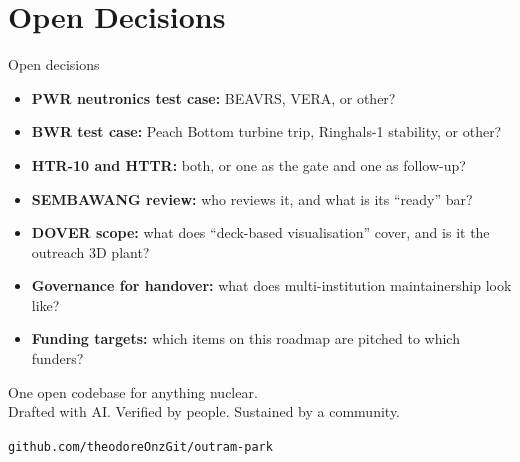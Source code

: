 \documentclass[aspectratio=169]{beamer}
\begin{document}
\section{Open Decisions}

\begin{frame}{Open decisions}
    \begin{itemize}
        \item \textbf{PWR neutronics test case:} BEAVRS, VERA, or other?
        \item \textbf{BWR test case:} Peach Bottom turbine trip, Ringhals-1
              stability, or other?
        \item \textbf{HTR-10 and HTTR:} both, or one as the gate and one
              as follow-up?
        \item \textbf{SEMBAWANG review:} who reviews it, and what is its
              ``ready'' bar?
        \item \textbf{DOVER scope:} what does ``deck-based visualisation''
              cover, and is it the outreach 3D plant?
        \item \textbf{Governance for handover:} what does multi-institution
              maintainership look like?
        \item \textbf{Funding targets:} which items on this roadmap are
              pitched to which funders?
    \end{itemize}
\end{frame}

\begin{frame}[plain]
    \begin{center}
        \Large One open codebase for anything nuclear.\\[4pt]
        \normalsize Drafted with AI. Verified by people. Sustained by a
        community.

        \bigskip
        \texttt{github.com/theodoreOnzGit/outram-park}
    \end{center}
\end{frame}
\end{document}

